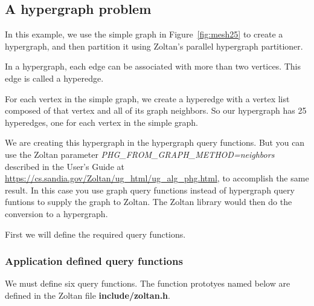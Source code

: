 \clearpage
\subsection{A hypergraph problem}

In this example, we use the simple graph in  Figure~\ref{fig:mesh25}
to create a hypergraph, and
then partition it using Zoltan's parallel hypergraph
partitioner.  

In a hypergraph, each edge can be associated with more than
two vertices.  This edge is called a hyperedge.

For each vertex in the simple graph, we create a hyperedge
with a vertex list composed of that vertex and all of its
graph neighbors.  So our hypergraph has 25 hyperedges, one
for each vertex in the simple graph.

We are creating this hypergraph in the hypergraph query functions.
But you can use the Zoltan parameter
\emph{PHG\_FROM\_GRAPH\_METHOD=neighbors} 
described in the User's Guide at 
\url{https://cs.sandia.gov/Zoltan/ug_html/ug_alg_phg.html},
to accomplish the same
result.  In this case you use graph query functions instead of
hypergraph query funtions to supply the 
graph to Zoltan.
The Zoltan library would then do the conversion to a hypergraph.

First we will define the required query functions.

\subsubsection{Application defined query functions}

We must define six query functions.  The function prototyes named 
below are defined in the Zoltan file \textbf{include/zoltan.h}.

